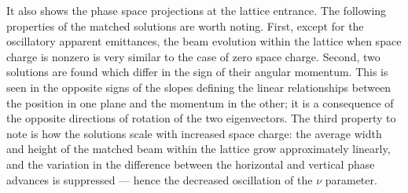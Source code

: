 %
It also shows the phase space projections at the lattice entrance. The following properties of the matched solutions are worth noting. First, except for the oscillatory apparent emittances, the beam evolution within the lattice when space charge is nonzero is very similar to the case of zero space charge. Second, two solutions are found which differ in the sign of their angular momentum. This is seen in the opposite signs of the slopes defining the linear relationships between the position in one plane and the momentum in the other; it is a consequence of the opposite directions of rotation of the two eigenvectors. The third property to note is how the solutions scale with increased space charge: the average width and height of the matched beam within the lattice grow approximately linearly, and the variation in the difference between the horizontal and vertical phase advances is suppressed — hence the decreased oscillation of the $\nu$ parameter. 

